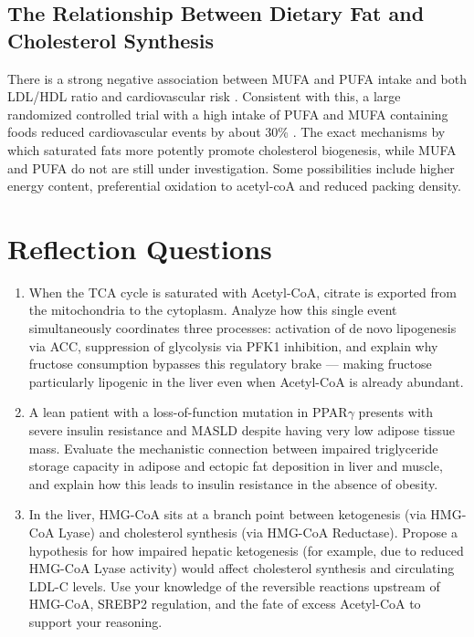 \documentclass{tufte-handout}
\begin{document}
\subsection{The Relationship Between Dietary Fat and Cholesterol Synthesis}

There is a strong negative association between MUFA and PUFA intake and both LDL/HDL ratio and cardiovascular risk \citep{Hu1998,Zong2016}.  Consistent with this, a large randomized controlled trial with a high intake of PUFA and MUFA containing foods reduced cardiovascular events by about 30\% \citep{Estruch2018}.  The exact mechanisms by which saturated fats more potently promote cholesterol biogenesis, while MUFA and PUFA do not are still under investigation.  Some possibilities include higher energy content, preferential oxidation to acetyl-coA and reduced packing density.



\section{Reflection Questions}
\begin{enumerate}
\item When the TCA cycle is saturated with Acetyl-CoA, citrate is exported from the mitochondria to the cytoplasm. Analyze how this single event simultaneously coordinates three processes: activation of de novo lipogenesis via ACC, suppression of glycolysis via PFK1 inhibition, and explain why fructose consumption bypasses this regulatory brake --- making fructose particularly lipogenic in the liver even when Acetyl-CoA is already abundant.
\item A lean patient with a loss-of-function mutation in PPAR$\gamma$ presents with severe insulin resistance and MASLD despite having very low adipose tissue mass. Evaluate the mechanistic connection between impaired triglyceride storage capacity in adipose and ectopic fat deposition in liver and muscle, and explain how this leads to insulin resistance in the absence of obesity.
\item In the liver, HMG-CoA sits at a branch point between ketogenesis (via HMG-CoA Lyase) and cholesterol synthesis (via HMG-CoA Reductase). Propose a hypothesis for how impaired hepatic ketogenesis (for example, due to reduced HMG-CoA Lyase activity) would affect cholesterol synthesis and circulating LDL-C levels. Use your knowledge of the reversible reactions upstream of HMG-CoA, SREBP2 regulation, and the fate of excess Acetyl-CoA to support your reasoning.
\end{enumerate}



\end{document}
